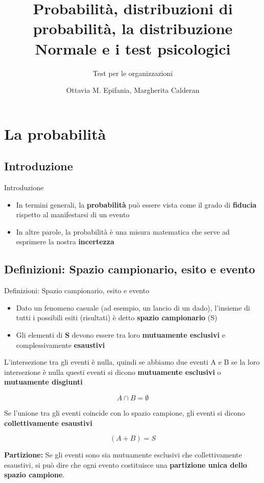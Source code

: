 \documentclass[
  ignorenonframetext,
  compress, aspectratio=149]{beamer}
\title{Probabilità, distribuzioni di probabilità, la distribuzione
Normale e i test psicologici}
\subtitle{Test per le organizzazioni}
\author{Ottavia M. Epifania, Margherita Calderan}
\date{}
\begin{document}
\frame{\titlepage}


\section{La probabilità}\label{la-probabilituxe0}

\subsection{Introduzione}\label{introduzione}

\begin{frame}{Introduzione}
\begin{itemize}
\item
  In termini generali, la \textbf{probabilità} può essere vista come il
  grado di \textbf{fiducia} rispetto al manifestarsi di un evento
\item
  In altre parole, la probabilità è una misura matematica che serve ad
  esprimere la nostra \textbf{incertezza}
\end{itemize}
\end{frame}

\subsection{Definizioni: Spazio campionario, esito e
evento}\label{definizioni-spazio-campionario-esito-e-evento}

\begin{frame}{Definizioni: Spazio campionario, esito e evento}
\begin{itemize}
\item
  Dato un fenomeno casuale (ad esempio, un lancio di un dado), l'insieme
  di tutti i possibili esiti (risultati) è detto \textbf{spazio
  campionario} (S)
\item
  Gli elementi di \textbf{S} devono essere tra loro \textbf{mutuamente
  esclusivi} e complessivamente \textbf{esaustivi}
\end{itemize}
\end{frame}

\begin{frame}
L'intersezione tra gli eventi è nulla, quindi se abbiamo due eventi A e
B se la loro intersezione è nulla questi eventi si dicono
\textbf{mutuamente esclusivi} o \textbf{mutuamente disgiunti}

\[A \cap B = \emptyset\]

Se l'unione tra gli eventi coincide con lo spazio campione, gli eventi
si dicono \textbf{collettivamente esaustivi}

\[(A + B) = S\]

\textbf{Partizione:} Se gli eventi sono sia mutuamente esclusivi che
collettivamente esaustivi, si può dire che ogni evento costituisce una
\textbf{partizione unica dello spazio campione}.
\end{frame}
\end{document}

